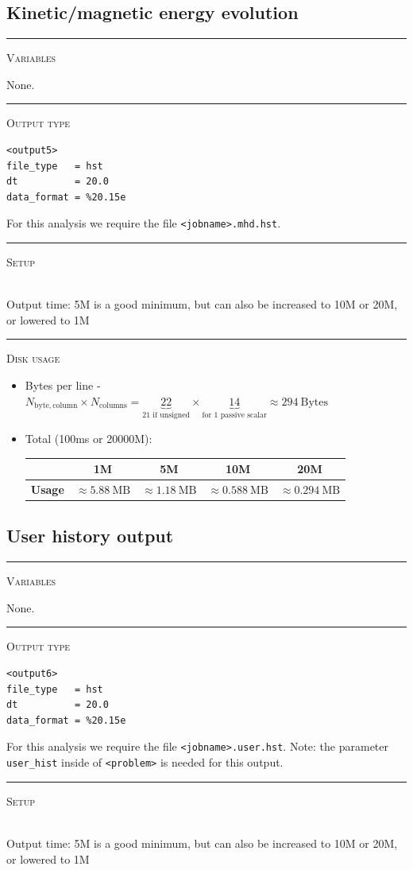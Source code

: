 \documentclass{article}
\newcommand{\var}[1]{%
  {\setlength{\fboxsep}{1.5pt}%
   \colorbox{varbg}{\textcolor{varfg}{\texttt{\small #1}}}}}
\newcommand{\step}[1]{%
  \par\medskip\noindent
  {\color{stepfg}\rule[-0.15ex]{2pt}{1.5ex}\hspace{0.5em}\scshape #1}%
  \hspace{0.75em}\ignorespaces}
\begin{document}
\subsection*{Kinetic/magnetic energy evolution}
\step{Variables} None.
\step{Output type}
\begin{verbatim}
<output5>
file_type   = hst
dt          = 20.0
data_format = %20.15e
\end{verbatim}
For this analysis we require the file \var{<jobname>.mhd.hst}.

\step{Setup}\mbox{}\\
Output time: 5M is a good minimum, but can also be increased to 10M or 20M, or lowered to 1M

\step{Disk usage}
\begin{itemize}
  \item Bytes per line - $N_{\mathrm{byte, column}}\times N_{\mathrm{columns}}=\underbrace{22}_{\text{21 if unsigned}}\times \underbrace{14}_{\text{for 1 passive scalar}}\approx 294\ \mathrm{Bytes}$
  \item Total (100ms or 20000M):
  \begin{raggedleft}
    \begin{tabular}{|c|c|c|c|c|}
      \hline
      &\textbf{1M}&\textbf{5M}&\textbf{10M}&\textbf{20M}\\
      \hline
      \textbf{Usage}&$\approx 5.88\ \mathrm{MB}$&$\approx 1.18\ \mathrm{MB}$&$\approx 0.588\ \mathrm{MB}$&$\approx 0.294\ \mathrm{MB}$\\
      \hline
    \end{tabular}
  \end{raggedleft}
\end{itemize}

\subsection*{User history output}
\step{Variables} None.
\step{Output type}
\begin{verbatim}
<output6>
file_type   = hst
dt          = 20.0
data_format = %20.15e
\end{verbatim}
For this analysis we require the file \var{<jobname>.user.hst}. Note: the parameter \var{user\_hist} inside of
\var{<problem>} is needed for this output.

\step{Setup}\mbox{}\\
Output time: 5M is a good minimum, but can also be increased to 10M or 20M, or lowered to 1M
\end{document}
